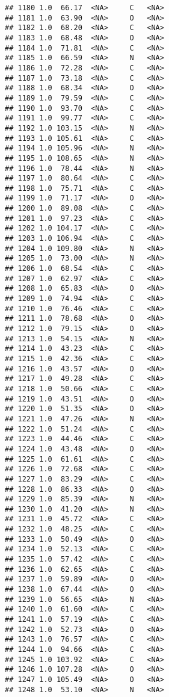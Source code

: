 \documentclass[
]{article}
\begin{document}
\begin{verbatim}
## 1180 1.0  66.17  <NA>     C   <NA>
## 1181 1.0  63.90  <NA>     O   <NA>
## 1182 1.0  68.20  <NA>     C   <NA>
## 1183 1.0  68.48  <NA>     O   <NA>
## 1184 1.0  71.81  <NA>     C   <NA>
## 1185 1.0  66.59  <NA>     N   <NA>
## 1186 1.0  72.28  <NA>     C   <NA>
## 1187 1.0  73.18  <NA>     C   <NA>
## 1188 1.0  68.34  <NA>     O   <NA>
## 1189 1.0  79.59  <NA>     C   <NA>
## 1190 1.0  93.70  <NA>     C   <NA>
## 1191 1.0  99.77  <NA>     C   <NA>
## 1192 1.0 103.15  <NA>     N   <NA>
## 1193 1.0 105.61  <NA>     C   <NA>
## 1194 1.0 105.96  <NA>     N   <NA>
## 1195 1.0 108.65  <NA>     N   <NA>
## 1196 1.0  78.44  <NA>     N   <NA>
## 1197 1.0  80.64  <NA>     C   <NA>
## 1198 1.0  75.71  <NA>     C   <NA>
## 1199 1.0  71.17  <NA>     O   <NA>
## 1200 1.0  89.08  <NA>     C   <NA>
## 1201 1.0  97.23  <NA>     C   <NA>
## 1202 1.0 104.17  <NA>     C   <NA>
## 1203 1.0 106.94  <NA>     C   <NA>
## 1204 1.0 109.80  <NA>     N   <NA>
## 1205 1.0  73.00  <NA>     N   <NA>
## 1206 1.0  68.54  <NA>     C   <NA>
## 1207 1.0  62.97  <NA>     C   <NA>
## 1208 1.0  65.83  <NA>     O   <NA>
## 1209 1.0  74.94  <NA>     C   <NA>
## 1210 1.0  76.46  <NA>     C   <NA>
## 1211 1.0  78.68  <NA>     O   <NA>
## 1212 1.0  79.15  <NA>     O   <NA>
## 1213 1.0  54.15  <NA>     N   <NA>
## 1214 1.0  43.23  <NA>     C   <NA>
## 1215 1.0  42.36  <NA>     C   <NA>
## 1216 1.0  43.57  <NA>     O   <NA>
## 1217 1.0  49.28  <NA>     C   <NA>
## 1218 1.0  50.66  <NA>     C   <NA>
## 1219 1.0  43.51  <NA>     O   <NA>
## 1220 1.0  51.35  <NA>     O   <NA>
## 1221 1.0  47.26  <NA>     N   <NA>
## 1222 1.0  51.24  <NA>     C   <NA>
## 1223 1.0  44.46  <NA>     C   <NA>
## 1224 1.0  43.48  <NA>     O   <NA>
## 1225 1.0  61.61  <NA>     C   <NA>
## 1226 1.0  72.68  <NA>     C   <NA>
## 1227 1.0  83.29  <NA>     C   <NA>
## 1228 1.0  86.33  <NA>     O   <NA>
## 1229 1.0  85.39  <NA>     N   <NA>
## 1230 1.0  41.20  <NA>     N   <NA>
## 1231 1.0  45.72  <NA>     C   <NA>
## 1232 1.0  48.25  <NA>     C   <NA>
## 1233 1.0  50.49  <NA>     O   <NA>
## 1234 1.0  52.13  <NA>     C   <NA>
## 1235 1.0  57.42  <NA>     C   <NA>
## 1236 1.0  62.65  <NA>     C   <NA>
## 1237 1.0  59.89  <NA>     O   <NA>
## 1238 1.0  67.44  <NA>     O   <NA>
## 1239 1.0  56.65  <NA>     N   <NA>
## 1240 1.0  61.60  <NA>     C   <NA>
## 1241 1.0  57.19  <NA>     C   <NA>
## 1242 1.0  52.73  <NA>     O   <NA>
## 1243 1.0  76.57  <NA>     C   <NA>
## 1244 1.0  94.66  <NA>     C   <NA>
## 1245 1.0 103.92  <NA>     C   <NA>
## 1246 1.0 107.28  <NA>     O   <NA>
## 1247 1.0 105.49  <NA>     O   <NA>
## 1248 1.0  53.10  <NA>     N   <NA>

\end{verbatim}
\end{document}
